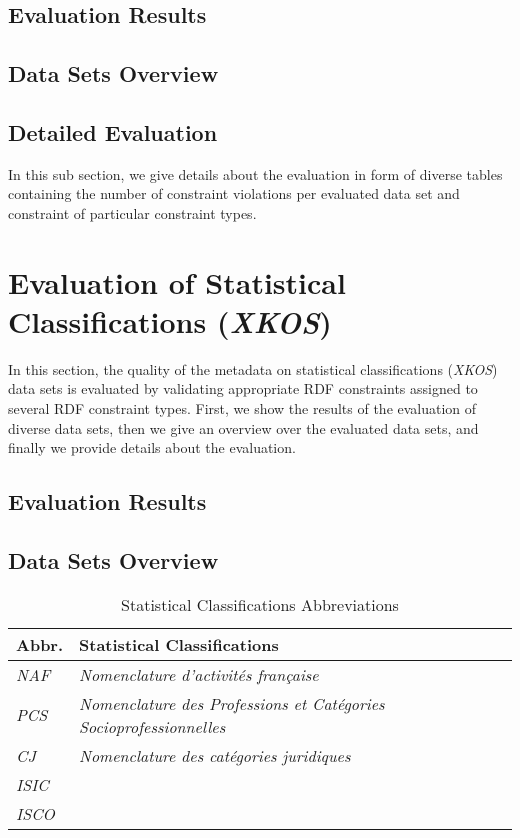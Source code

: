 \documentclass{llncs}
\begin{document}
\subsection{Evaluation Results}

\subsection{Data Sets Overview}

\subsection{Detailed Evaluation}

In this sub section, we give details about the evaluation in form of diverse tables containing the number of constraint violations per evaluated data set and constraint of particular constraint types.

\section{Evaluation of Statistical Classifications (\emph{XKOS})}

In this section, the quality of the metadata on statistical classifications (\emph{XKOS}) data sets is evaluated by validating appropriate RDF constraints assigned to several RDF constraint types.
First, we show the results of the evaluation of diverse data sets, then we give an overview over the evaluated data sets, and finally we provide details about the evaluation.

\subsection{Evaluation Results}

\subsection{Data Sets Overview}

\begin{table}[H]
	\centering
		\begin{tabular}{l|l}
      \textbf{Abbr.} & \textbf{Statistical Classifications} \\		
      \hline
    \emph{NAF} & \emph{Nomenclature d'activités française}\tablefootnote{\url{http://rdf.insee.fr/codes/index.html}} \\
		\emph{PCS} & \emph{Nomenclature des Professions et Catégories Socioprofessionnelles}\tablefootnote{\url{http://rdf.insee.fr/codes/index.html}} \\
		\emph{CJ} & \emph{Nomenclature des catégories juridiques}\tablefootnote{\url{http://rdf.insee.fr/codes/index.html}} \\
		\emph{ISIC} & \\
		\emph{ISCO} & \\
		\end{tabular}
	\caption{Statistical Classifications Abbreviations}
	\label{tab:statistical-classifications-abbreviations}
\end{table}
\end{document}
